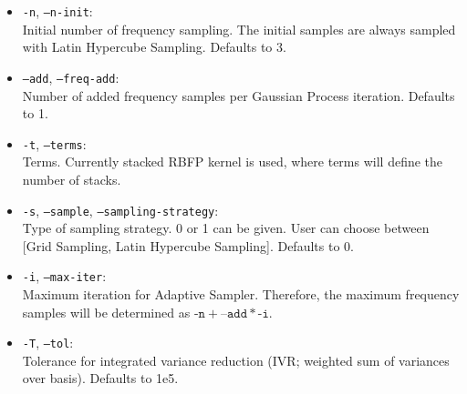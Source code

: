 \begin{itemize}
  \\Type of acquisition function for adaptive sampling. An integer $\in [0, 2]$ can be given. User can choose between [maximum variance, expected improvement, upper confidence bound]. Defaults to 0.
  \item \texttt{-n}, \texttt{--n-init}: 
  \\Initial number of frequency sampling. The initial samples are always sampled with Latin Hypercube Sampling. Defaults to 3.
  \item \texttt{--add}, \texttt{--freq-add}: 
  \\Number of added frequency samples per Gaussian Process iteration. Defaults to 1.
  \item \texttt{-t}, \texttt{--terms}: 
  \\Terms. Currently stacked RBFP kernel is used, where terms will define the number of stacks.
  \item \texttt{-s}, \texttt{--sample}, \texttt{--sampling-strategy}: 
  \\Type of sampling strategy. 0 or 1 can be given. User can choose between [Grid Sampling, Latin Hypercube Sampling]. Defaults to 0.
  \item \texttt{-i}, \texttt{--max-iter}: 
  \\Maximum iteration for Adaptive Sampler. Therefore, the maximum frequency samples will be determined as $\boxed{\texttt{-n}} + \boxed{\texttt{--add}} * \boxed{\texttt{-i}}$.
  \item \texttt{-T}, \texttt{--tol}: 
  \\Tolerance for integrated variance reduction (IVR; weighted sum of variances over basis). Defaults to 1e5.
\end{itemize}
